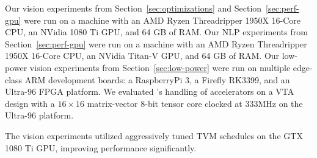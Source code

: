 
  Our vision experiments from Section~\ref{sec:optimizations} and Section~\ref{sec:perf-gpu} were run on a machine with an AMD Ryzen
    Threadripper 1950X 16-Core CPU,
    an NVidia 1080 Ti GPU,
    and 64 GB of RAM.
  Our NLP experiments from Section~\ref{sec:perf-gpu} were run on a machine with an AMD Ryzen
    Threadripper 1950X 16-Core CPU,
    an NVidia Titan-V GPU,
    and 64 GB of RAM.
  Our low-power vision experiments from Section~\ref{sec:low-power} were run on multiple edge-class ARM development boards: a RaspberryPi 3, a Firefly RK3399, and an Ultra-96 FPGA platform.
  We evaluated \relay's handling of accelerators on a VTA design with a
    $16\times16$ matrix-vector 8-bit tensor core clocked at 333MHz on the Ultra-96 platform.


  The \relay vision experiments utilized aggressively tuned TVM schedules on the GTX 1080 Ti GPU,
    improving performance significantly.


